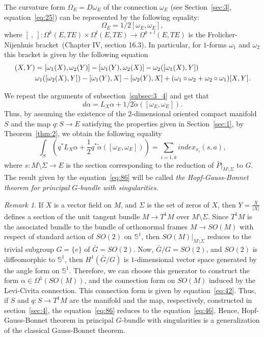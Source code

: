\documentclass[12pt,letterpaper]{amsart}
\theoremstyle{definition}
\theoremstyle{plain}
\theoremstyle{remark}
\newtheorem{rem}{Remark}
\begin{document}
The curvature form $\Omega_E= D\omega_E$ of the connection $\omega_E$ (see Section~\ref{sec:3}, equation~\eqref{eq:25}) can be represented by the following equality:
\begin{equation}
\Omega_E=1/2[\omega_E, \omega_E],
\label{eq:84}
\end{equation}
where $[ \ , \ ]: \Omega^{k}(E, TE)\times \Omega^{l}(E, TE)\rightarrow \Omega^{k+l}(E, TE)$ is the Frolicher-Nijenhuis bracket~\cite{michor2000}(Chapter IV, section 16.3).
In particular, for $1$-forms $\omega_1$ and $\omega_2$ this bracket is given by the following equation
\begin{align*}
[w_1, w_2](X, Y)&=[\omega_1(X), \omega_2(Y)]-[\omega_1(Y), \omega_2(X)]-\omega_2([\omega_1(X), Y])\-\\& \omega_1([\omega_2(X), Y])-[\omega_1(Y),X]-[\omega_2(Y), X]+(\omega_1 \circ \omega_2+\omega_2 \circ \omega_1)[X,Y].
\end{align*}

We repeat the arguments of subsection~\ref{subsec:3_4} and get that
\begin{equation}
d\alpha=L_X\alpha+1/2\tilde{\alpha}([\omega_E, \omega_E]).
\label{eq:85}
\end{equation}
Thus, by assuming the existence of the $2$-dimensional oriented compact manifold $S$ and the map $q:S\rightarrow E$ satisfying the properties given in Section~\ref{sec:1}, by Theorem~\ref{thm:2}, we obtain the following equality
\begin{equation}
\int_S(q^{*}L_X\alpha +\frac{1}{2}q^{*}\tilde{\alpha}([\omega_E, \omega_E]))=\sum_{i=\overline{1, k}} index_{x_i}(s,a),
\label{eq:86}
\end{equation}
where $s:M\setminus\Sigma \rightarrow E$ is the section corresponding to the reduction of $\bar{P}|_{M\setminus \Sigma}$ to $G$. The result given by the equation~\eqref{eq:86} will be called \emph{the Hopf-Gauss-Bonnet theorem for principal $G$-bundle with singularities}.


\begin{rem}
If $X$ is a vector field on $M$, and $\Sigma$ is the set of zeros of $X$, then $Y=\frac{X}{|X|}$ defines a section of the unit tangent bundle $M\rightarrow T^{1}M$ over $M\setminus \Sigma$.
Since $T^{1}M$ is the associated bundle to the bundle of orthonormal frames $M\rightarrow SO(M)$ with respect of standard action of $SO(2)$ on $\mathbb{S}^{1}$, then $SO(M)|_{M\setminus \Sigma}$ reduces to the trivial subgroup $G=\{e \}$ of $\bar{G}=SO(2)$.
Now, $\bar{G}/G=SO(2)$, and $SO(2)$ is diffeomorphic to $\mathbb{S}^{1}$, then $H^{1}(\bar{G}/G)$ is $1$-dimensional vector space generated by the angle form on $\mathbb{S}^{1}$.
Therefore, we can choose this generator to construct the form $\alpha\in \Omega^{1}(SO(M))$, and the connection form on $SO(M)$ induced by the Levi-Civita connection.
This connection form is given by equation~\eqref{eq:42}.
Thus, if $S$ and $q: S \rightarrow T^{1}M$ are the manifold and the map, respectively, constructed in section~\ref{sec:4}, the equation~\eqref{eq:86} reduces to the equation~\eqref{eq:46}.  
Hence, Hopf-Gauss-Bonnet theorem in principal $G$-bundle with singularities is a generalization of the classical Gauss-Bonnet theorem.
\label{rem:10}
\end{rem}
\end{document}

